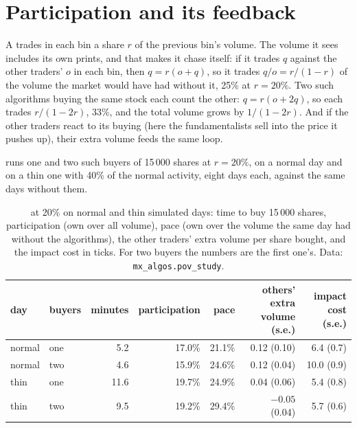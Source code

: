 \section{Participation and its feedback}

A  trades in each bin a share $r$ of the previous bin's volume. The volume it sees includes its own prints, and that makes it
chase itself: if it trades $q$ against the other traders' $o$ in each bin, then $q=r(o+q)$, so it trades $q/o=r/(1-r)$ of the volume the market
would have had without it, 25\% at $r=20\%$. Two such algorithms buying the same stock each count the other: $q=r(o+2q)$, so each trades
$r/(1-2r)$, 33\%, and the total volume grows by $1/(1-2r)$. And if the other traders react to its buying (here the fundamentalists sell into the
price it pushes up), their extra volume feeds the same loop.

\label{lst:mx:benchmark-algorithms:pov}

 runs one and two such buyers of 15\,000 shares at $r=20\%$, on a normal day and on a thin one with 40\% of the
normal activity, eight days each, against the same days without them.

\begin{table}[ht]
\centering
\small
\begin{tabular}{@{}llrrrrr@{}}
\toprule
day & buyers & minutes & participation & pace & others' extra volume (s.e.) & impact cost (s.e.) \\
\midrule
normal & one & 5.2 & 17.0\% & 21.1\% & 0.12 (0.10) & 6.4 (0.7) \\
normal & two & 4.6 & 15.9\% & 24.6\% & 0.12 (0.04) & 10.0 (0.9) \\
thin & one & 11.6 & 19.7\% & 24.9\% & 0.04 (0.06) & 5.4 (0.8) \\
thin & two & 9.5 & 19.2\% & 29.4\% & $-0.05$ (0.04) & 5.7 (0.6) \\
\bottomrule
\end{tabular}
\caption{ at 20\% on normal and thin simulated days: time to buy 15\,000 shares, participation (own over all volume),
pace (own over the volume the same day had without the algorithms), the other traders' extra volume per share bought, and the impact cost in ticks.
For two buyers the numbers are the first one's. Data: \texttt{mx\_algos.pov\_study}.}\label{tab:mx:benchmark-algorithms:pov}
\end{table}

